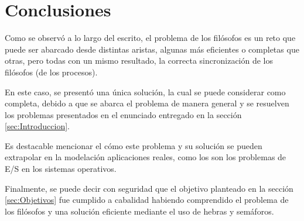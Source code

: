 \section{Conclusiones}
Como se observó a lo largo del escrito, el problema de los filósofos es un reto que puede ser abarcado desde distintas aristas, algunas más eficientes o completas que otras, pero todas con un mismo resultado, la correcta sincronización de los filósofos (de los procesos).

En este caso, se presentó una única solución, la cual se puede considerar como completa, debido a que se abarca el problema de manera general y se resuelven los problemas presentados en el enunciado entregado en la sección \ref{sec:Introduccion}.

Es destacable mencionar el cómo este problema y su solución se pueden extrapolar en la modelación aplicaciones reales, como los son los problemas de E/S en los sistemas operativos.

Finalmente, se puede decir con seguridad que el objetivo planteado en la sección \ref{sec:Objetivos} fue cumplido a cabalidad habiendo comprendido el problema de los filósofos y una solución eficiente mediante el uso de hebras y semáforos.





